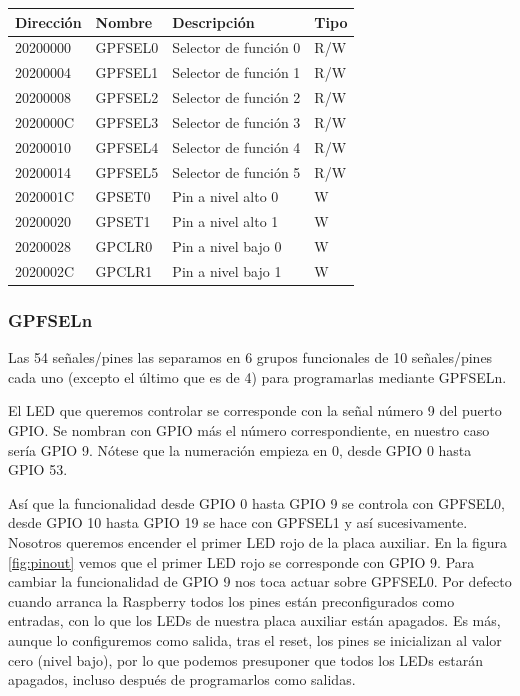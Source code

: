 \begin{table}
\centering
\begin{tabular}{ p{1.8cm} | p{2cm} | p{5cm} | p{1cm} }
{\bf Dirección} & {\bf Nombre} & {\bf Descripción} & {\bf Tipo} \\
\hline
20200000 & GPFSEL0 & Selector de función 0 & R/W \\
20200004 & GPFSEL1 & Selector de función 1 & R/W \\
20200008 & GPFSEL2 & Selector de función 2 & R/W \\
2020000C & GPFSEL3 & Selector de función 3 & R/W \\
20200010 & GPFSEL4 & Selector de función 4 & R/W \\
20200014 & GPFSEL5 & Selector de función 5 & R/W \\
2020001C & GPSET0  & Pin a nivel alto 0 & W   \\
20200020 & GPSET1  & Pin a nivel alto 1 & W   \\
20200028 & GPCLR0  & Pin a nivel bajo 0 & W  \\
2020002C & GPCLR1  & Pin a nivel bajo 1 & W  \\
\end{tabular}
\end{table}


\subsubsection{GPFSELn}

Las 54 señales/pines las separamos en 6
grupos funcionales de 10 señales/pines cada uno (excepto el último
que es de 4) para programarlas mediante GPFSELn.

El LED que queremos controlar se corresponde con la señal número 9 del puerto GPIO.
Se nombran con GPIO más el número correspondiente, en nuestro caso sería GPIO 9. Nótese
que la numeración empieza en 0, desde GPIO 0 hasta GPIO 53.

Así que la funcionalidad desde GPIO 0 hasta GPIO 9 se controla con
GPFSEL0, desde GPIO 10 hasta GPIO 19 se hace con GPFSEL1 y así
sucesivamente. Nosotros queremos encender el primer LED rojo de la placa auxiliar.
En la figura \ref{fig:pinout} vemos que el primer LED rojo se corresponde con GPIO 9.
Para cambiar la funcionalidad de GPIO 9 nos toca actuar sobre GPFSEL0. Por
defecto cuando arranca la Raspberry todos los pines están preconfigurados
como entradas, con lo que los LEDs de nuestra placa auxiliar
están apagados. Es más, aunque lo configuremos como salida, tras el reset,
los pines se inicializan al valor cero (nivel bajo), por lo que podemos presuponer que
todos los LEDs estarán apagados, incluso después de programarlos como salidas.

